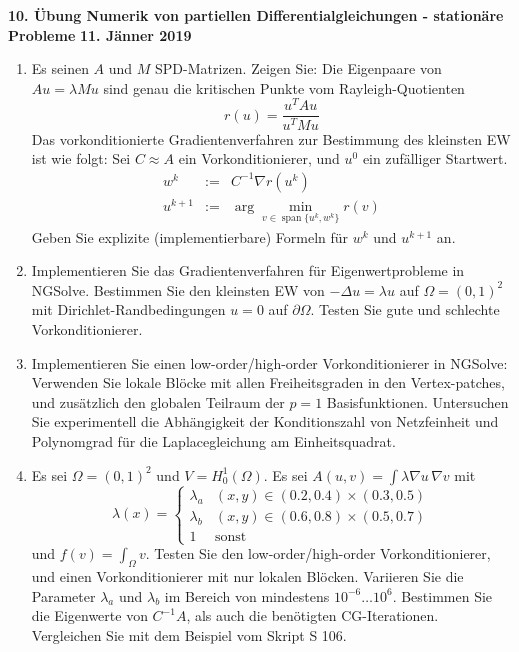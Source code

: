 \documentclass[11pt,a4paper]{report}
\begin{document}
\begin{center}
\textbf{10. \"Ubung Numerik von partiellen Differentialgleichungen - station\"are Probleme} \newline 
\textbf{11. J\"anner 2019}
\end{center}


\begin{enumerate}

\item Es seinen $A$ und $M$ SPD-Matrizen. Zeigen Sie: Die Eigenpaare von $A u = \lambda M u$ sind genau die kritischen Punkte vom Rayleigh-Quotienten
  $$
  r(u) = \frac{u^T A u }{u^T M u}
  $$
Das vorkonditionierte Gradientenverfahren zur Bestimmung des kleinsten
EW ist wie folgt: Sei $C \approx A$ ein Vorkonditionierer, und $u^0$ ein zuf\"alliger Startwert.
\begin{eqnarray*}
  w^k & := & C^{-1} \nabla r (u^k) \\
  u^{k+1} & :=& \operatorname{arg}\min_{v \in \operatorname{span} \{u^k,
    w^k \}}  r(v)
\end{eqnarray*}
Geben Sie explizite (implementierbare) Formeln f\"ur $w^k$ und $u^{k+1}$ an.   

\item Implementieren Sie das Gradientenverfahren f\"ur
  Eigenwertprobleme in NGSolve. Bestimmen
  Sie den kleinsten EW von $-\Delta u = \lambda u$ auf $\Omega =
  (0,1)^2$ mit Dirichlet-Randbedingungen $u = 0$ auf $\partial
  \Omega$. Testen Sie gute und schlechte Vorkonditionierer.


\item Implementieren Sie einen low-order/high-order Vorkonditionierer
  in NGSolve: Verwenden Sie lokale Bl\"ocke mit allen Freiheitsgraden
  in den Vertex-patches, und zus\"atzlich den globalen Teilraum der $p=1$
  Basisfunktionen. Untersuchen Sie experimentell die Abh\"angigkeit
  der Konditionszahl von Netzfeinheit und Polynomgrad f\"ur die
  Laplacegleichung am Einheitsquadrat.

\item Es sei $\Omega = (0,1)^2$ und $V = H_0^1(\Omega)$. Es sei
  $A(u,v) = \int \lambda \nabla u \, \nabla v$ mit 
  $$
  \lambda(x) = \left\{ \begin{array} {cl}
                         \lambda_a  & (x,y) \in (0.2, 0.4) \times (0.3, 0.5)
                         \\
                         \lambda_b  & (x,y) \in (0.6, 0.8) \times (0.5, 0.7)
                         \\
                         1 & \text{sonst}
                             \end{array}
                             \right.
  $$
und $f(v) = \int_\Omega v$. Testen Sie den low-order/high-order
Vorkonditionierer, und einen Vorkonditionierer mit nur lokalen
Bl\"ocken. Variieren Sie die Parameter $\lambda_a$ und $\lambda_b$ im
Bereich von mindestens $10^{-6} \ldots 10^6$. Bestimmen Sie die
Eigenwerte von $C^{-1} A$, als auch die ben\"otigten
CG-Iterationen. Vergleichen Sie mit dem Beispiel vom Skript S 106.

\end{enumerate}
\end{document}

